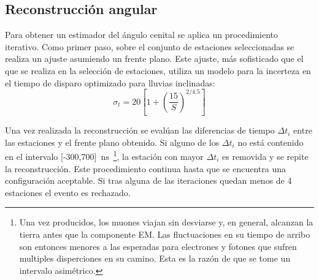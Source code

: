 	\subsection{Reconstrucción angular}
	\label{sbsc:thetaRec}
	
	Para obtener un estimador del ángulo cenital se aplica un procedimiento iterativo.
	Como primer paso, sobre el conjunto de estaciones seleccionadas se realiza un ajuste asumiendo un frente plano.
	Este ajuste, más sofisticado que el que se realiza en la selección de estaciones, utiliza un modelo para la incerteza en el tiempo de disparo \cite{cite:ines} optimizado para lluvias inclinadas:
	\begin{equation}
	\sigma_t = 20 \left[ 1 + \left( \frac{15}{S} \right)^{2/4.5} \right]
	\label{ec:varT} 
	\end{equation}

	

	Una vez realizada la reconstrucción se evalúan las diferencias de tiempo $\Delta t_i$ entre las estaciones y el frente plano obtenido.
	Si alguno de los $\Delta t_i$ no está contenido en el intervalo [-300,700]~$\mbox{ns}$~\footnote{
	Una vez producidos, los muones viajan sin desviarse y, en general, alcanzan la tierra antes que la componente EM. 
	Las fluctuaciones en su tiempo de arribo son entonces menores a las esperadas para electrones y fotones que sufren multiples disperciones en su camino.
	Esta es la razón de que se tome un intervalo asimétrico.
	},
	la estación con mayor $\Delta t_i$ es removida y se repite la reconstrucción.
	Este procedimiento continua hasta que se encuentra una configuración aceptable.
	Si tras alguna de las iteraciones quedan menos de 4 estaciones el evento es rechazado.
	
